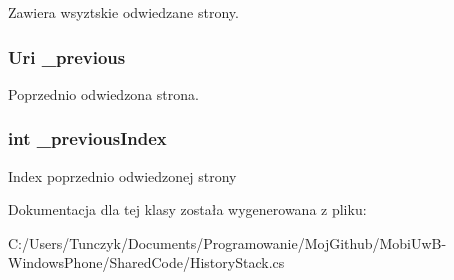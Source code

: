 Zawiera wsyztskie odwiedzane strony. 

\hypertarget{a00022_a896aadbe729203007cd6b868f9d5dcf7}{}
\subsubsection[{\+\_\+previous}]{\setlength{\rightskip}{0pt plus 5cm}Uri \+\_\+previous\hspace{0.3cm}{\ttfamily [private]}}\label{a00022_a896aadbe729203007cd6b868f9d5dcf7}


Poprzednio odwiedzona strona. 

\hypertarget{a00022_afb3036bab776e1852f6b7238f3b0f2b9}{}
\subsubsection[{\+\_\+previous\+Index}]{\setlength{\rightskip}{0pt plus 5cm}int \+\_\+previous\+Index\hspace{0.3cm}{\ttfamily [private]}}\label{a00022_afb3036bab776e1852f6b7238f3b0f2b9}


Index poprzednio odwiedzonej strony 



Dokumentacja dla tej klasy została wygenerowana z pliku\+:\begin{DoxyCompactItemize}
\item 
C\+:/\+Users/\+Tunczyk/\+Documents/\+Programowanie/\+Moj\+Github/\+Mobi\+Uw\+B-\/\+Windows\+Phone/\+Shared\+Code/History\+Stack.\+cs\end{DoxyCompactItemize}
